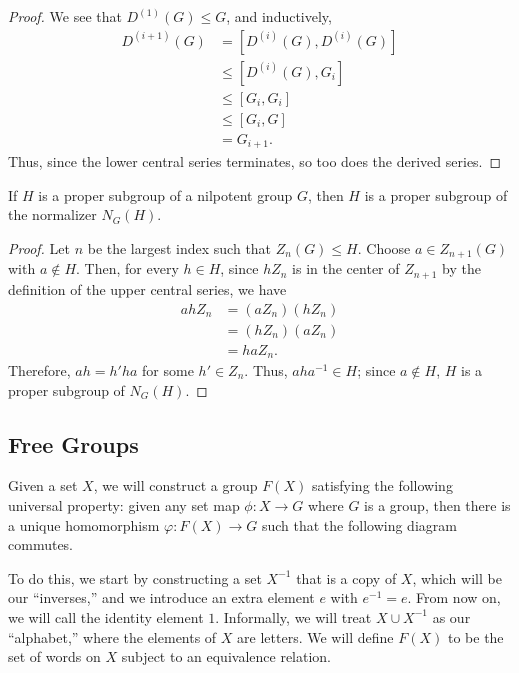 \documentclass[10pt]{mypackage}
\begin{document}
\begin{proof}
  We see that $D^{(1)}(G)\leq G$, and inductively,
  \begin{align*}
    D^{(i+1)}(G) &= \left[ D^{(i)}(G),D^{(i)}(G) \right]\\
                 &\leq \left[ D^{(i)}(G),G_i \right]\\
                 &\leq \left[ G_i,G_i \right]\\
                 &\leq \left[ G_i,G \right]\\
                 &= G_{i+1}.
  \end{align*}
  Thus, since the lower central series terminates, so too does the derived series.
\end{proof}
\begin{lemma}
  If $H$ is a proper subgroup of a nilpotent group $G$, then $H$ is a proper subgroup of the normalizer $N_G(H)$.
\end{lemma}
\begin{proof}
  Let $n$ be the largest index such that $Z_n(G) \leq H$. Choose $a\in Z_{n+1}(G)$ with $a\notin H$. Then, for every $h\in H$, since $hZ_n$ is in the center of $Z_{n+1}$ by the definition of the upper central series, we have
  \begin{align*}
    ahZ_n &= \left( aZ_n \right)\left( hZ_n \right)\\
          &= \left( hZ_n \right)\left( aZ_n \right)\\
          &= haZ_n.
  \end{align*}
  Therefore, $ah = h'ha$ for some $h'\in Z_n$. Thus, $aha^{-1}\in H$; since $a\notin H$, $H$ is a proper subgroup of $N_G(H)$.
\end{proof}
\subsection{Free Groups}%
Given a set $X$, we will construct a group $F(X)$ satisfying the following universal property: given any set map $\phi\colon X\rightarrow G$ where $G$ is a group, then there is a unique homomorphism $\varphi\colon F(X)\rightarrow G$ such that the following diagram commutes.
\begin{center}
\end{center}
To do this, we start by constructing a set $X^{-1}$ that is a copy of $X$, which will be our ``inverses,'' and we introduce an extra element $e$ with $e^{-1} = e$. From now on, we will call the identity element $1$. Informally, we will treat $X\cup X^{-1}$  as our ``alphabet,'' where the elements of $X$ are letters. We will define $F(X)$ to be the set of words on $X$ subject to an equivalence relation.%
\end{document}
